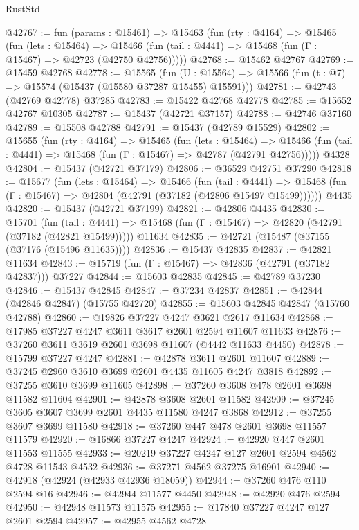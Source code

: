 \begin{lexlean}{RustStd}
\begin{coremodule}
@42767 := fun (params : @15461) =>
  @15463
    (fun (rty : @4164) =>
    @15465
      (fun (lets : @15464) =>
      @15466 (fun (tail : @4441) => @15468 (fun (Γ : @15467) => @42723 (@42750 @42756)))))
@42768 := @15462 @42767
@42769 := @15459 @42768
@42778 := @15565
    (fun (U : @15564) => @15566 (fun (t : @7) => @15574 (@15437 (@15580 @37287 @15455) @15591)))
@42781 := @42743 (@42769 @42778) @37285
@42783 := @15422 @42768 @42778
@42785 := @15652 @42767 @10305
@42787 := @15437 (@42721 @37157)
@42788 := @42746 @37160
@42789 := @15508 @42788
@42791 := @15437 (@42789 @15529)
@42802 := @15655
    (fun (rty : @4164) =>
    @15465
      (fun (lets : @15464) =>
      @15466 (fun (tail : @4441) => @15468 (fun (Γ : @15467) => @42787 (@42791 @42756)))))
    @4328
@42804 := @15437 (@42721 @37179)
@42806 := @36529 @42751 @37290
@42818 := @15677
    (fun (lets : @15464) =>
    @15466
      (fun (tail : @4441) =>
      @15468 (fun (Γ : @15467) => @42804 (@42791 (@37182 (@42806 @15497 @15499))))))
    @4435
@42820 := @15437 (@42721 @37199)
@42821 := @42806 @4435
@42830 := @15701
    (fun (tail : @4441) => @15468 (fun (Γ : @15467) => @42820 (@42791 (@37182 (@42821 @15499)))))
    @11634
@42835 := @42721 (@15487 (@37155 (@37176 (@15496 @11635))))
@42836 := @15437 @42835
@42837 := @42821 @11634
@42843 := @15719 (fun (Γ : @15467) => @42836 (@42791 (@37182 @42837))) @37227
@42844 := @15603 @42835
@42845 := @42789 @37230
@42846 := @15437 @42845
@42847 := @37234 @42837
@42851 := @42844 (@42846 @42847) (@15755 @42720)
@42855 := @15603 @42845 @42847 (@15760 @42788)
@42860 := @19826 @37227 @4247 @3621 @2617 @11634
@42868 := @17985 @37227 @4247 @3611 @3617 @2601 @2594 @11607 @11633
@42876 := @37260 @3611 @3619 @2601 @3698 @11607 (@4442 @11633 @4450)
@42878 := @15799 @37227 @4247
@42881 := @42878 @3611 @2601 @11607
@42889 := @37245 @2960 @3610 @3699 @2601 @4435 @11605 @4247 @3818
@42892 := @37255 @3610 @3699 @11605
@42898 := @37260 @3608 @478 @2601 @3698 @11582 @11604
@42901 := @42878 @3608 @2601 @11582
@42909 := @37245 @3605 @3607 @3699 @2601 @4435 @11580 @4247 @3868
@42912 := @37255 @3607 @3699 @11580
@42918 := @37260 @447 @478 @2601 @3698 @11557 @11579
@42920 := @16866 @37227 @4247
@42924 := @42920 @447 @2601 @11553 @11555
@42933 := @20219 @37227 @4247 @127 @2601 @2594 @4562 @4728 @11543 @4532
@42936 := @37271 @4562 @37275 @16901
@42940 := @42918 (@42924 (@42933 @42936 @18059))
@42944 := @37260 @476 @110 @2594 @16
@42946 := @42944 @11577 @4450
@42948 := @42920 @476 @2594
@42950 := @42948 @11573 @11575
@42955 := @17840 @37227 @4247 @127 @2601 @2594
@42957 := @42955 @4562 @4728

\end{coremodule}
\end{lexlean}
